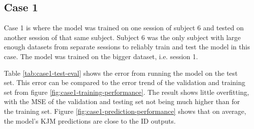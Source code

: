 \documentclass[../main.tex]{subfiles}
\begin{document}
\subsection{Case 1}
\label{sec:results-case1}
Case 1 is where the model was trained on one session of subject 6 and tested on another session of that same subject.
Subject 6 was the only subject with large enough datasets from separate sessions to reliably train and test the model in this case.
The model was trained on the bigger dataset, i.e. session 1.

Table \ref{tab:case1-test-eval} shows the error from running the model on the test set.
This error can be compared to the error trend of the validation and training set from figure \ref{fig:case1-training-performance}.
The result shows little overfitting, with the \ac{MSE} of the validation and testing set not being much higher than for the training set.
Figure \ref{fig:case1-prediction-performance} shows that on average, the model's \ac{KJM} predictions are close to the \ac{ID} outputs.

\end{document}
